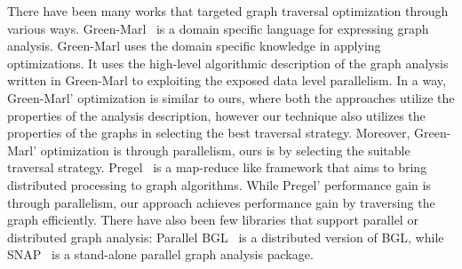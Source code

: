 There have been many works that targeted graph traversal optimization through
various ways. Green-Marl~\cite{hong2012green} is a domain specific language for
expressing graph analysis. Green-Marl uses the domain specific knowledge in
applying optimizations. It uses the high-level algorithmic description of the
graph analysis written in Green-Marl to exploiting the exposed data level
parallelism.
In a way, Green-Marl' optimization is similar to ours, where both the approaches
utilize the properties of the analysis description, however our technique also
utilizes the properties of the graphs in selecting the best traversal strategy.
Moreover, Green-Marl' optimization is through parallelism, ours is by selecting
the suitable traversal strategy.
Pregel~\cite{malewicz2010pregel} is a map-reduce like framework that aims to
bring distributed processing to graph algorithms. While Pregel' performance gain
is through parallelism, our approach achieves performance gain by traversing the
graph efficiently.
There have also been few libraries that support parallel or distributed graph
analysis: Parallel BGL~\cite{gregor2005parallel} is a distributed version of
BGL, while SNAP~\cite{bader2008snap} is a stand-alone parallel graph analysis
package.



